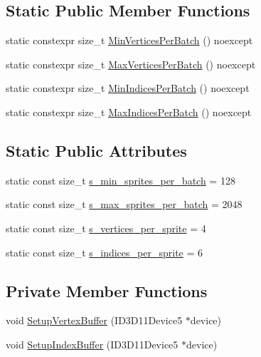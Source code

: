 \subsection*{Static Public Member Functions}
\begin{DoxyCompactItemize}
\item 
static constexpr size\+\_\+t \hyperlink{classmage_1_1_sprite_batch_mesh_a489cec36c8cee8ece130b2c22597c711}{Min\+Vertices\+Per\+Batch} () noexcept
\item 
static constexpr size\+\_\+t \hyperlink{classmage_1_1_sprite_batch_mesh_a63c6b47e82be3175891ceb41847ed64d}{Max\+Vertices\+Per\+Batch} () noexcept
\item 
static constexpr size\+\_\+t \hyperlink{classmage_1_1_sprite_batch_mesh_af97c5b660417a70f9a0365c74279ef3e}{Min\+Indices\+Per\+Batch} () noexcept
\item 
static constexpr size\+\_\+t \hyperlink{classmage_1_1_sprite_batch_mesh_a3c4aa8a1c0d5055e3e9b2290b2957bba}{Max\+Indices\+Per\+Batch} () noexcept
\end{DoxyCompactItemize}
\subsection*{Static Public Attributes}
\begin{DoxyCompactItemize}
\item 
static const size\+\_\+t \hyperlink{classmage_1_1_sprite_batch_mesh_accc52fa93a3c7d42e2d4db54c1211d5d}{s\+\_\+min\+\_\+sprites\+\_\+per\+\_\+batch} = 128
\item 
static const size\+\_\+t \hyperlink{classmage_1_1_sprite_batch_mesh_aa4c18beb1d7355a184ac3c93c6a254e3}{s\+\_\+max\+\_\+sprites\+\_\+per\+\_\+batch} = 2048
\item 
static const size\+\_\+t \hyperlink{classmage_1_1_sprite_batch_mesh_a089a9cf9b57f43274bb2542b3c30dd55}{s\+\_\+vertices\+\_\+per\+\_\+sprite} = 4
\item 
static const size\+\_\+t \hyperlink{classmage_1_1_sprite_batch_mesh_a9560987925304ec757cac212d8b921f5}{s\+\_\+indices\+\_\+per\+\_\+sprite} = 6
\end{DoxyCompactItemize}
\subsection*{Private Member Functions}
\begin{DoxyCompactItemize}
\item 
void \hyperlink{classmage_1_1_sprite_batch_mesh_a37bc0b6b46e9ea34ee8acdc1d039a050}{Setup\+Vertex\+Buffer} (I\+D3\+D11\+Device5 $\ast$device)
\item 
void \hyperlink{classmage_1_1_sprite_batch_mesh_ab4e5400f881e5ca489fd59933401b9ce}{Setup\+Index\+Buffer} (I\+D3\+D11\+Device5 $\ast$device)
\end{DoxyCompactItemize}

